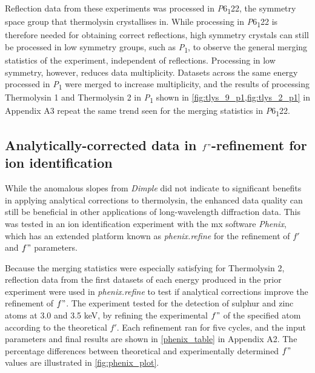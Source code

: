 Reflection data from these experiments was processed in \textit{P}6\textsubscript{1}22, the symmetry space group that thermolysin crystallises in. While processing in \textit{P}6\textsubscript{1}22 is therefore needed for obtaining correct reflections, high symmetry crystals can still be processed in low symmetry groups, such as \textit{P}\textsubscript{1}, to observe the general merging statistics of the experiment, independent of reflections.
Processing in low symmetry, however, reduces data multiplicity. Datasets across the same energy processed in \textit{P}\textsubscript{1} were merged to increase multiplicity, and the results of processing Thermolysin 1 and Thermolysin 2 in \textit{P}\textsubscript{1} shown in \cref{fig:tlys_9_p1,fig:tlys_2_p1} in Appendix A3 repeat the same trend seen for the merging statistics in \textit{P}6\textsubscript{1}22.

\subsection{Analytically-corrected data in $f"$-refinement for ion identification}


While the anomalous slopes from \textit{Dimple} did not indicate to significant benefits in applying analytical corrections to thermolysin, the enhanced data quality can still be beneficial in other applications of long-wavelength diffraction data. This was tested in an ion identification experiment with the \ac{mx} software \textit{Phenix}, which has an extended platform known as \textit{phenix.refine} for the refinement of $f'$ and $f"$ parameters.

Because the merging statistics were especially satisfying for Thermolysin 2, reflection data from the first datasets of each energy produced 
in the prior experiment were used in \textit{phenix.refine} to test if analytical corrections improve the refinement of $f"$. The experiment tested for the detection of sulphur and zinc atoms at 3.0 and 3.5 \unit{keV}, by refining the experimental $f"$ of the specified atom according to the theoretical $f'$. Each refinement ran for five cycles, and the input parameters and final results are shown in \cref{phenix_table} in Appendix A2. The percentage differences between theoretical and experimentally determined $f"$ values are illustrated in \cref{fig:phenix_plot}.%


